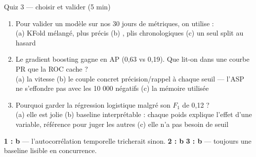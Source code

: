 \begin{frame}{Quiz 3 --- choisir et valider (5 min)}
\begin{qbox}[3 questions]
\begin{enumerate}
\item Pour valider un modèle sur nos 30 jours de métriques, on utilise :\\
(a) KFold mélangé, plus précis \quad (b) , plis
chronologiques \quad (c) un seul split au hasard
\item Le gradient boosting gagne en AP (0,63 vs 0,19). Que lit-on
dans une courbe PR que la ROC cache ?\\
(a) la vitesse \quad (b) le couple concret précision/rappel à chaque
seuil --- l'ASP ne s'effondre pas avec les 10 000 négatifs \quad
(c) la mémoire utilisée
\item Pourquoi garder la régression logistique malgré son $F_1$ de 0,12 ?\\
(a) elle est jolie \quad (b) baseline interprétable : chaque poids
explique l'effet d'une variable, référence pour juger les autres \quad
(c) elle n'a pas besoin de seuil
\end{enumerate}
\end{qbox}
\vspace{1mm}
\begin{solbox}[Réponses]
\textbf{1 : b} --- l'autocorrélation temporelle tricherait sinon.
\quad \textbf{2 : b} \quad \textbf{3 : b} --- toujours une baseline
lisible en concurrence.
\end{solbox}
\end{frame}

